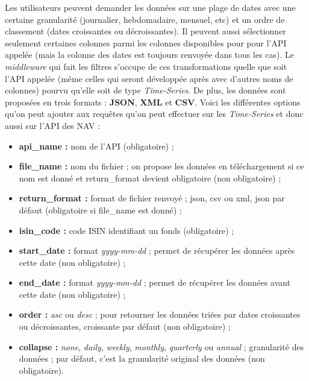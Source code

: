 \vspace{3mm}

Les utilisateurs peuvent demander les données sur une plage de dates avec une certaine granularité (journalier, hebdomadaire, mensuel, etc) et un ordre de classement (dates croissantes ou décroissantes). Il peuvent aussi sélectionner seulement certaines colonnes parmi les colonnes disponibles pour pour l'API appelée (mais la colonne des dates est toujours renvoyée dans tous les cas). Le \textit{middleware} qui fait les filtres s'occupe de ces transformations quelle que soit l'API appelée (même celles qui seront développée après avec d'autres noms de colonnes) pourvu qu'elle soit de type  \textit{Time-Series}. De plus, les données sont proposées en trois formats : \textbf{JSON}, \textbf{XML} et \textbf{CSV}. Voici les différentes options qu'on peut ajouter aux requêtes qu'on peut effectuer sur les \textit{Time-Series} et donc aussi sur l'API des NAV :

\begin{itemize}[font=\color{blue}, label=]
  \item \textbf{api\_name :} nom de l'API (obligatoire) ;
  \item \textbf{file\_name :} nom du fichier ; on propose les données en téléchargement si ce nom est donné et return\_format devient obligatoire (non obligatoire) ;
  \item \textbf{return\_format :} format de fichier renvoyé ; json, csv ou xml, json par défaut (obligatoire si file\_name est donné) ;
  \item \textbf{isin\_code :} code ISIN identifiant un fonds (obligatoire) ;
  \item \textbf{start\_date :} format \textit{yyyy-mm-dd} ; permet de récupérer les données après cette date (non obligatoire) ;
  \item \textbf{end\_date :} format \textit{yyyy-mm-dd} ; permet de récupérer les données avant cette date (non obligatoire) ;
  \item \textbf{order :} \textit{asc} ou \textit{desc} ; pour retourner les données triées par dates croissantes ou décroissantes, croissante par défaut (non obligatoire) ;
  \item \textbf{collapse :} \textit{none}, \textit{daily}, \textit{weekly}, \textit{monthly}, \textit{quarterly} ou \textit{annual} ; granularité des données ; par défaut, c'est la granularité original des données (non obligatoire).
\end{itemize}


